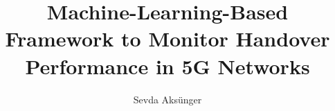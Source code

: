 \documentclass[magister,druk,en]{dyplom}
\author{Sevda Aksünger}
\title{Machine-Learning-Based Framework to Monitor Handover Performance in 5G Networks}
\begin{document}
\maketitle



\tableofcontents
















\listoffigures
\listoftables

\appendixpage
\appendix

\end{document}
